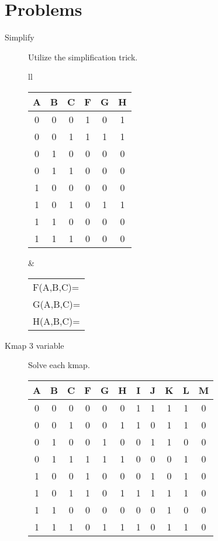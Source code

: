 \section{Problems}
\begin{description}

    \item[Simplify] Utilize the simplification trick.

        \begin{tabular}{ll}
            \begin{tabular}{c|c|c||c|c|c}
                A & B & C & F & G & H  \\ \hline
                0 & 0 & 0 & 1 & 0 & 1  \\ \hline
                0 & 0 & 1 & 1 & 1 & 1  \\ \hline
                0 & 1 & 0 & 0 & 0 & 0  \\ \hline
                0 & 1 & 1 & 0 & 0 & 0  \\ \hline
                1 & 0 & 0 & 0 & 0 & 0  \\ \hline
                1 & 0 & 1 & 0 & 1 & 1  \\ \hline
                1 & 1 & 0 & 0 & 0 & 0  \\ \hline
                1 & 1 & 1 & 0 & 0 & 0  \\
            \end{tabular}
            &
            \begin{tabular}{l}
                F(A,B,C)= \\
                G(A,B,C)= \\
                H(A,B,C)= \\
            \end{tabular}
        \end{tabular}

        \pagebreak

    \item[Kmap 3 variable] Solve each kmap.

        \begin{tabular}{c|c|c||c|c|c|c|c|c|c|c}
            A & B & C & F & G & H & I & J & K & L & M  \\ \hline
            0 & 0 & 0 & 0 & 0 & 0 & 1 & 1 & 1 & 1 & 0  \\ \hline
            0 & 0 & 1 & 0 & 0 & 1 & 1 & 0 & 1 & 1 & 0  \\ \hline
            0 & 1 & 0 & 0 & 1 & 0 & 0 & 1 & 1 & 0 & 0  \\ \hline
            0 & 1 & 1 & 1 & 1 & 1 & 0 & 0 & 0 & 1 & 0  \\ \hline
            1 & 0 & 0 & 1 & 0 & 0 & 0 & 1 & 0 & 1 & 0  \\ \hline
            1 & 0 & 1 & 1 & 0 & 1 & 1 & 1 & 1 & 1 & 0  \\ \hline
            1 & 1 & 0 & 0 & 0 & 0 & 0 & 0 & 1 & 0 & 0  \\ \hline
            1 & 1 & 1 & 0 & 1 & 1 & 1 & 0 & 1 & 1 & 0
        \end{tabular}


\end{description}

